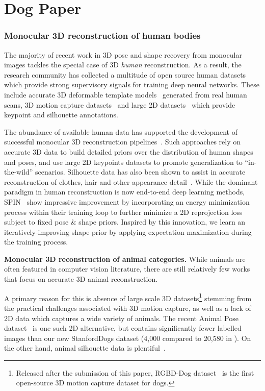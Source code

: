 \section{Dog Paper}

\subsubsection{Monocular 3D reconstruction of human bodies}
The majority of recent work in 3D pose and shape recovery from monocular images tackles the special case of 3D \emph{human} reconstruction. As a result, the research community has collected a multitude of open source human datasets which provide strong supervisory signals for training deep neural networks. These include accurate 3D deformable template models~\cite{loper15smpl} generated from real human scans, 3D motion capture datasets~\cite{ionescu2013human3,vonmarcard2018recovering} and large 2D datasets~\cite{lin2014microsoft,johnson2010clustered,andriluka14cvpr} which provide keypoint and silhouette annotations. 

The abundance of available human data has supported the development of successful monocular 3D reconstruction pipelines~\cite{kolotouros19convolutional,kanazawa18end-to-end}. Such approaches rely on accurate 3D data to build detailed priors over the distribution of human shapes and poses, and use large 2D keypoints datasets to promote generalization to ``in-the-wild'' scenarios. Silhouette data has also been shown to assist in accurate reconstruction of clothes, hair and other appearance detail~\cite{pifuSHNMKL19,alldieck2019learning}.
While the dominant paradigm in human reconstruction is now end-to-end deep learning methods, SPIN~\cite{kolotouros19learning} show impressive improvement by incorporating an energy minimization process within their training loop to further minimize a 2D reprojection loss subject to fixed pose \& shape priors. Inspired by this innovation, we learn an iteratively-improving shape prior by applying expectation maximization during the training process.

\textbf{Monocular 3D reconstruction of animal categories.}
While animals are often featured in computer vision literature, there are still relatively few works that focus on accurate 3D animal reconstruction. 

A primary reason for this is absence of large scale 3D datasets\footnote{Released after the submission of this paper, RGBD-Dog dataset~\cite{Kearney_2020_CVPR} is the first open-source 3D motion capture dataset for dogs.} stemming from the practical challenges associated with 3D motion capture, as well as a lack of 2D data which captures a wide variety of animals. The recent Animal Pose dataset~\cite{animalpose} is one such 2D alternative, but contains significantly fewer labelled images than our new StanfordDogs dataset (4,000 compared to 20,580 in ). 
On the other hand, animal silhouette data is plentiful~\cite{lin2014microsoft,everingham2010pascal,DAVIS2017-2nd}.

